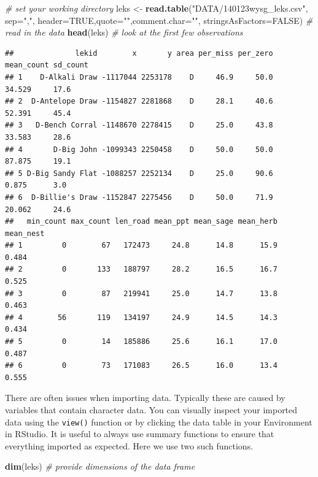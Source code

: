 \documentclass[
]{book}
\newenvironment{Shaded}{\begin{snugshade}}{\end{snugshade}}
\newcommand{\AttributeTok}[1]{\textcolor[rgb]{0.13,0.29,0.53}{#1}}
\newcommand{\CommentTok}[1]{\textcolor[rgb]{0.56,0.35,0.01}{\textit{#1}}}
\newcommand{\ConstantTok}[1]{\textcolor[rgb]{0.56,0.35,0.01}{#1}}
\newcommand{\FunctionTok}[1]{\textcolor[rgb]{0.13,0.29,0.53}{\textbf{#1}}}
\newcommand{\NormalTok}[1]{#1}
\newcommand{\OtherTok}[1]{\textcolor[rgb]{0.56,0.35,0.01}{#1}}
\newcommand{\StringTok}[1]{\textcolor[rgb]{0.31,0.60,0.02}{#1}}
\begin{document}
\begin{Shaded}
\begin{Highlighting}[]
\CommentTok{\# set your working directory}
\NormalTok{leks }\OtherTok{\textless{}{-}} \FunctionTok{read.table}\NormalTok{(}\StringTok{"DATA/140123wysg\_leks.csv"}\NormalTok{, }\AttributeTok{sep=}\StringTok{","}\NormalTok{, }\AttributeTok{header=}\ConstantTok{TRUE}\NormalTok{,}\AttributeTok{quote=}\StringTok{""}\NormalTok{,}\AttributeTok{comment.char=}\StringTok{""}\NormalTok{, }
\AttributeTok{stringsAsFactors=}\ConstantTok{FALSE}\NormalTok{)  }\CommentTok{\# read in the data}
\FunctionTok{head}\NormalTok{(leks)  }\CommentTok{\# look at the first few observations}
\end{Highlighting}
\end{Shaded}

\begin{verbatim}
##              lekid        x       y area per_miss per_zero mean_count sd_count
## 1    D-Alkali Draw -1117044 2253178    D     46.9     50.0     34.529     17.6
## 2  D-Antelope Draw -1154827 2281868    D     28.1     40.6     52.391     45.4
## 3   D-Bench Corral -1148670 2278415    D     25.0     43.8     33.583     28.6
## 4       D-Big John -1099343 2250458    D     50.0     50.0     87.875     19.1
## 5 D-Big Sandy Flat -1088257 2252134    D     25.0     90.6      0.875      3.0
## 6  D-Billie's Draw -1152847 2275456    D     50.0     71.9     20.062     24.6
##   min_count max_count len_road mean_ppt mean_sage mean_herb mean_nest
## 1         0        67   172473     24.8      14.8      15.9     0.484
## 2         0       133   188797     28.2      16.5      16.7     0.525
## 3         0        87   219941     25.0      14.7      13.8     0.463
## 4        56       119   134197     24.9      14.5      14.3     0.434
## 5         0        14   185886     25.6      16.1      17.0     0.487
## 6         0        73   171083     26.5      16.0      13.4     0.555
\end{verbatim}

There are often issues when importing data. Typically these are caused by variables that contain character data. You can visually inspect your imported data using the \texttt{view()} function or by clicking the data table in your Environment in RStudio. It is useful to always use summary functions to ensure that everything imported as expected. Here we use two such functions.

\begin{Shaded}
\begin{Highlighting}[]
\FunctionTok{dim}\NormalTok{(leks)  }\CommentTok{\# provide dimensions of the data frame}
\end{Highlighting}
\end{Shaded}
\end{document}
